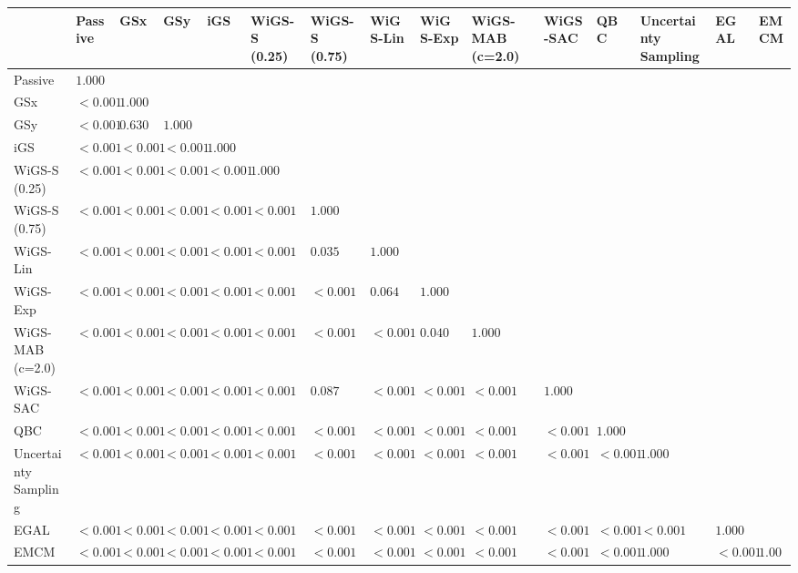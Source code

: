 \begin{tabular}{lllllllllllllll}
\toprule
 & Passive & GSx & GSy & iGS & WiGS-S (0.25) & WiGS-S (0.75) & WiGS-Lin & WiGS-Exp & WiGS-MAB (c=2.0) & WiGS-SAC & QBC & Uncertainty Sampling & EGAL & EMCM \\
\midrule
Passive & $1.000$ &  &  &  &  &  &  &  &  &  &  &  &  &  \\
GSx & $<0.001$ & $1.000$ &  &  &  &  &  &  &  &  &  &  &  &  \\
GSy & $<0.001$ & $0.630$ & $1.000$ &  &  &  &  &  &  &  &  &  &  &  \\
iGS & $<0.001$ & $<0.001$ & $<0.001$ & $1.000$ &  &  &  &  &  &  &  &  &  &  \\
WiGS-S (0.25) & $<0.001$ & $<0.001$ & $<0.001$ & $<0.001$ & $1.000$ &  &  &  &  &  &  &  &  &  \\
WiGS-S (0.75) & $<0.001$ & $<0.001$ & $<0.001$ & $<0.001$ & $<0.001$ & $1.000$ &  &  &  &  &  &  &  &  \\
WiGS-Lin & $<0.001$ & $<0.001$ & $<0.001$ & $<0.001$ & $<0.001$ & $0.035$ & $1.000$ &  &  &  &  &  &  &  \\
WiGS-Exp & $<0.001$ & $<0.001$ & $<0.001$ & $<0.001$ & $<0.001$ & $<0.001$ & $0.064$ & $1.000$ &  &  &  &  &  &  \\
WiGS-MAB (c=2.0) & $<0.001$ & $<0.001$ & $<0.001$ & $<0.001$ & $<0.001$ & $<0.001$ & $<0.001$ & $0.040$ & $1.000$ &  &  &  &  &  \\
WiGS-SAC & $<0.001$ & $<0.001$ & $<0.001$ & $<0.001$ & $<0.001$ & $0.087$ & $<0.001$ & $<0.001$ & $<0.001$ & $1.000$ &  &  &  &  \\
QBC & $<0.001$ & $<0.001$ & $<0.001$ & $<0.001$ & $<0.001$ & $<0.001$ & $<0.001$ & $<0.001$ & $<0.001$ & $<0.001$ & $1.000$ &  &  &  \\
Uncertainty Sampling & $<0.001$ & $<0.001$ & $<0.001$ & $<0.001$ & $<0.001$ & $<0.001$ & $<0.001$ & $<0.001$ & $<0.001$ & $<0.001$ & $<0.001$ & $1.000$ &  &  \\
EGAL & $<0.001$ & $<0.001$ & $<0.001$ & $<0.001$ & $<0.001$ & $<0.001$ & $<0.001$ & $<0.001$ & $<0.001$ & $<0.001$ & $<0.001$ & $<0.001$ & $1.000$ &  \\
EMCM & $<0.001$ & $<0.001$ & $<0.001$ & $<0.001$ & $<0.001$ & $<0.001$ & $<0.001$ & $<0.001$ & $<0.001$ & $<0.001$ & $<0.001$ & $1.000$ & $<0.001$ & $1.000$ \\
\bottomrule
\end{tabular}
